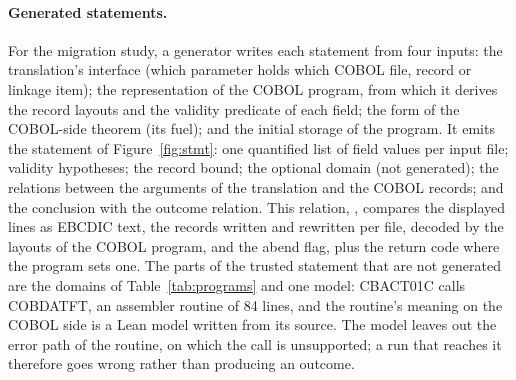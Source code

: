 \paragraph{Generated statements.} For the migration study, a generator writes each statement from four inputs: the
translation's interface (which parameter holds which COBOL file, record or linkage item); the representation of the
COBOL program, from which it derives the record layouts and the validity predicate of each field; the form of the
COBOL-side theorem (its fuel); and the initial storage of the program. It emits the statement of
Figure~\ref{fig:stmt}: one quantified list of field values per input file; validity hypotheses; the record bound; the
optional domain (not generated); the relations between the arguments of the translation and the COBOL records; and the
conclusion with the outcome relation. This relation, , compares the displayed lines as EBCDIC text, the records written
and rewritten per file, decoded by the layouts of the COBOL program, and the abend flag, plus the return code where
the program sets one. The parts of the trusted statement that are not generated are the domains of Table~\ref{tab:programs} and
one model: CBACT01C calls COBDATFT, an assembler routine of 84 lines, and the routine's meaning on the COBOL side is
a Lean model written from its source. The model leaves out the error path of the routine, on which the call is unsupported; a run
that reaches it therefore goes wrong rather than producing an outcome.

